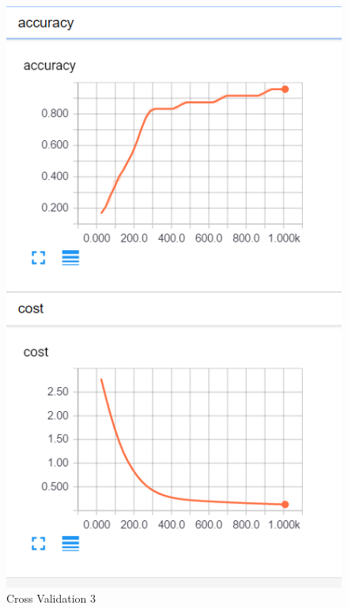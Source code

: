 \documentclass[12pt]{article}
\begin{document}
\begin{figure}[H]
	\begin{center}
	\includegraphics{./pictures/cv3.png}
	\caption{Cross Validation 3}
	\label{GD}
	\end{center}
\end{figure}
\end{document}
